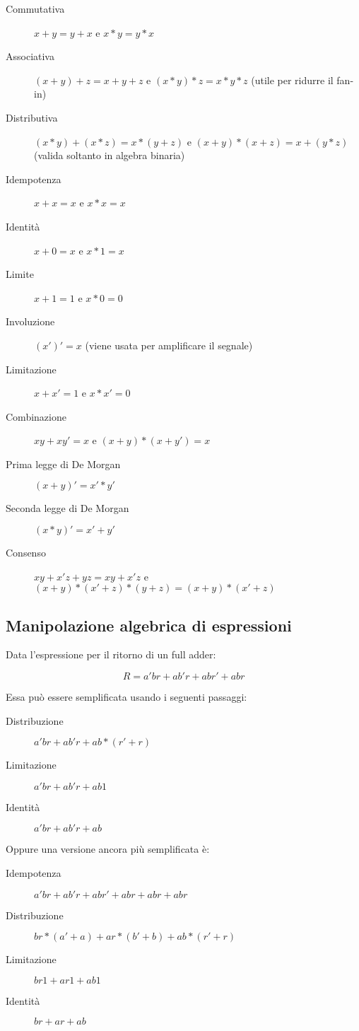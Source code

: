 \documentclass{subfiles}
\begin{document}
\begin{description}
    \item[Commutativa] $x+y = y+x$ e $x*y = y*x$
    \item[Associativa] $(x+y)+z = x+y+z$ e $(x*y)*z = x*y*z$ (utile per ridurre il fan-in)
    \item[Distributiva] $(x*y) + (x*z) = x*(y+z)$ e $(x+y) * (x+z) = x+(y*z)$ (valida soltanto in algebra binaria)
    \item[Idempotenza] $x+x = x$ e $x*x = x$
    \item[Identità] $x+0 = x$ e $x*1 = x$
    \item[Limite] $x+1 = 1$ e $x*0 = 0$
    \item[Involuzione] $(x')' = x$ (viene usata per amplificare il segnale)
    \item[Limitazione] $x+x' = 1$ e $x * x' = 0$
    \item[Combinazione] $xy + xy' = x$ e $(x+y) * (x+y') = x$
    \item[Prima legge di De Morgan] $(x+y)' = x'*y'$
    \item[Seconda legge di De Morgan] $(x*y)' = x'+y'$
    \item[Consenso] $xy+x'z+yz = xy+x'z$ e $(x+y)*(x'+z)*(y+z) = (x+y)*(x'+z)$
\end{description}

\subsection{Manipolazione algebrica di espressioni}

Data l'espressione per il ritorno di un full adder:

$$
R = a'br + ab'r + abr' + abr
$$

\noindent
Essa può essere semplificata usando i seguenti passaggi:

\begin{description}
    \item[Distribuzione] $a'br + ab'r + ab*(r'+r)$
    \item[Limitazione] $a'br + ab'r + ab1$
    \item[Identità] $a'br + ab'r + ab$
\end{description}

\noindent
Oppure una versione ancora più semplificata è:

\begin{description}
    \item[Idempotenza] $a'br + ab'r + abr' + abr + abr + abr$
    \item[Distribuzione] $br*(a'+a) + ar*(b'+b) + ab*(r'+r)$
    \item[Limitazione] $br1 + ar1 + ab1$
    \item[Identità] $br + ar + ab$
\end{description}
\end{document}
